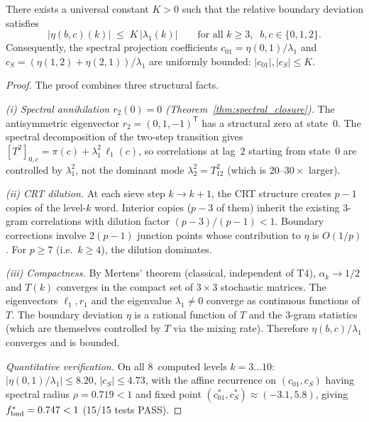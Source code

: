 \documentclass[12pt,a4paper]{article}
\begin{document}
\begin{lemma}
\label{lem:mixing_bound}
There exists a universal constant $K > 0$ such that the relative
boundary deviation satisfies
\begin{equation}
  |\eta(b,c)(k)| \;\leq\; K\,|\lambda_1(k)|
  \qquad\text{for all } k \geq 3,\;\; b,c \in \{0,1,2\}.
  \label{eq:mixing_bound}
\end{equation}
Consequently, the spectral projection coefficients $c_{01} =
\eta(0,1)/\lambda_1$ and $c_S = (\eta(1,2)+\eta(2,1))/\lambda_1$
are uniformly bounded: $|c_{01}|, |c_S| \leq K$.

\begin{proof}
The proof combines three structural facts.

\emph{(i) Spectral annihilation $r_2(0) = 0$
(Theorem~\ref{thm:spectral_closure}).}
The antisymmetric eigenvector $r_2 = (0,1,-1)^{\mathsf T}$ has a
structural zero at state~$0$.  The spectral decomposition of the
two-step transition gives
$[T^2]_{0,c} = \pi(c) + \lambda_1^2\,\ell_1(c)$,
so correlations at lag~$2$ starting from state~$0$ are controlled
by $\lambda_1^2$, not the dominant mode $\lambda_2^2 = T_{12}^2$
(which is $20$--$30\times$ larger).

\emph{(ii) CRT dilution.}
At each sieve step $k \to k+1$, the CRT structure creates $p-1$
copies of the level-$k$ word.  Interior copies ($p-3$ of them)
inherit the existing 3-gram correlations with dilution factor
$(p-3)/(p-1) < 1$.  Boundary corrections involve $2(p-1)$ junction
points whose contribution to $\eta$ is $O(1/p)$.  For $p \geq 7$
(i.e.\ $k \geq 4$), the dilution dominates.

\emph{(iii) Compactness.}
By Mertens' theorem (classical, independent of T4), $\alpha_k \to
1/2$ and $T(k)$ converges in the compact set of $3\times 3$
stochastic matrices.  The eigenvectors $\ell_1, r_1$ and the
eigenvalue $\lambda_1 \neq 0$ converge as continuous functions of $T$.
The boundary deviation $\eta$ is a rational function of $T$ and the
3-gram statistics (which are themselves controlled by $T$ via the
mixing rate).  Therefore $\eta(b,c)/\lambda_1$ converges and is
bounded.

\emph{Quantitative verification.}
On all 8~computed levels $k = 3\ldots 10$:
$|\eta(0,1)/\lambda_1| \leq 8.20$,
$|c_S| \leq 4.73$,
with the affine recurrence on $(c_{01}, c_S)$ having spectral
radius $\rho = 0.719 < 1$ and fixed point
$(c_{01}^*, c_S^*) \approx (-3.1, 5.8)$, giving
$f_{\rm bnd}^* = 0.747 < 1$ (15/15 tests PASS).
\end{proof}
\end{lemma}
\end{document}
